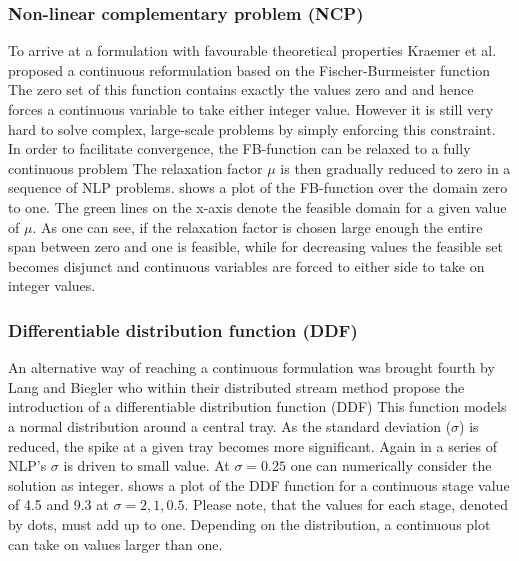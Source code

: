         \subsubsection{Non-linear complementary problem (NCP)}
        To arrive at a formulation with favourable theoretical properties Kraemer et al. \cite{Kraemer.2009} proposed
        a continuous reformulation based on the Fischer-Burmeister function
        The zero set of this function contains exactly the values zero and and hence forces a continuous variable to
        take either integer value. However it is still very hard to solve complex, large-scale problems by simply 
        enforcing this constraint. In order to facilitate convergence, the FB-function can be relaxed to a fully 
        continuous problem
        The relaxation factor $\mu$ is then gradually reduced to zero in a sequence of NLP problems. 
        shows a plot of the FB-function over the domain zero to one. The green lines on the x-axis denote the feasible domain
        for a given value of $\mu$. As one can see, if the relaxation factor is chosen large enough the entire span
        between zero and one is feasible, while for decreasing values the feasible set becomes disjunct and continuous 
        variables are forced to either side to take on integer values. 

        \subsubsection{Differentiable distribution function (DDF)}
        An alternative way of reaching a continuous formulation was brought fourth by Lang and Biegler \cite{Lang.2002}
        who within their distributed stream method propose the introduction of a differentiable distribution function (DDF)
        This function models a normal distribution around a central tray. As the standard deviation ($\sigma$) is reduced, 
        the spike at a given tray becomes more significant. Again in a series of NLP's $\sigma$ is driven to small value. 
        At $\sigma = 0.25$ one can numerically consider the solution as integer.  shows a plot 
        of the DDF function for a continuous stage value of 4.5 and 9.3 at $\sigma = 2, 1, 0.5$. Please note, that the
        values for each stage, denoted by dots, must add up to one. Depending on the distribution, a continuous plot can take 
        on values larger than one.   
